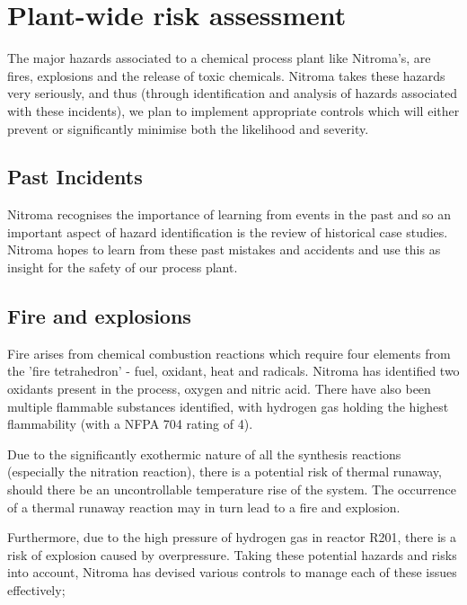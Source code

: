 \section{Plant-wide risk assessment}

The major hazards associated to a chemical process plant like Nitroma’s, are fires, explosions and the release of toxic chemicals. Nitroma takes these hazards very seriously, and thus (through identification and analysis of hazards associated with these incidents), we plan to implement appropriate controls which will either prevent or significantly minimise both the likelihood and severity. 

\subsection{Past Incidents}

Nitroma recognises the importance of learning from events in the past and so an important aspect of hazard identification is the review of historical case studies. Nitroma hopes to learn from these past mistakes and accidents and use this as insight for the safety of our process plant.






\subsection{Fire and explosions}

Fire arises from chemical combustion reactions which require four elements from the 'fire tetrahedron' - fuel, oxidant, heat and radicals. Nitroma has identified two oxidants present in the process, oxygen and nitric acid. There have also been multiple flammable substances identified, with hydrogen gas holding the highest flammability (with a NFPA 704 rating of 4). 

Due to the significantly exothermic nature of all the synthesis reactions (especially the nitration reaction), there is a potential risk of thermal runaway, should there be an uncontrollable temperature rise of the system. The occurrence of a thermal runaway reaction may in turn lead to a fire and explosion.  

Furthermore, due to the high pressure of hydrogen gas in reactor R201, there is a risk of explosion caused by overpressure. Taking these potential hazards and risks into account, Nitroma has devised various controls to manage each of these issues effectively; 


